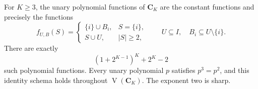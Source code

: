 \begin{proposition}
\label{core:prop:unary-polynomials}
For $K\geq3$, the unary polynomial functions of $\mathbf C_K$ are
the constant functions and precisely the functions
\begin{equation}\label{core:eq:unary-profile}
 f_{U,B}(S)=
 \begin{cases}
  \{i\}\cup B_i,&S=\{i\},\\
  S\cup U,&|S|\geq2,
 \end{cases}
 \qquad
 U\subseteq I,\quad B_i\subseteq U\setminus\{i\}.
\end{equation}
There are exactly
\[
 (1+2^{K-1})^K+2^K-2
\]
such polynomial functions. Every unary polynomial $p$ satisfies
$p^3=p^2$, and this identity schema holds throughout
$\operatorname V(\mathbf C_K)$. The exponent two is sharp.
\end{proposition}
